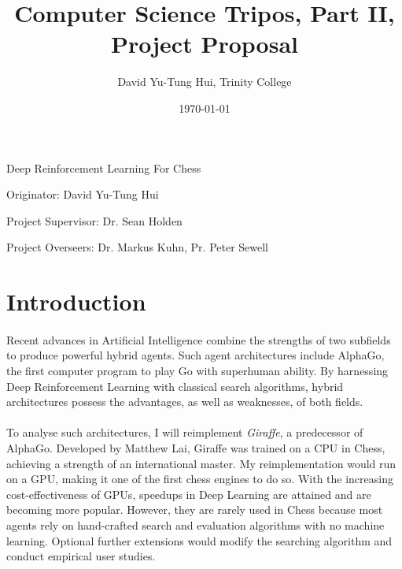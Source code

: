 \documentclass[a4paper]{article}
\title{Computer Science Tripos, Part II, Project Proposal}
\author{David Yu-Tung Hui, Trinity College}
\date{\today}
\begin{document}
\maketitle

\centerline{\huge Deep Reinforcement Learning For Chess}
\vspace{0.2in}
\centerline{\large Originator: David Yu-Tung Hui}
\vspace{0.05in}
\centerline{\large Project Supervisor: Dr. Sean Holden}
\vspace{0.05in}
\centerline{\large Project Overseers: Dr. Markus Kuhn, Pr. Peter Sewell}


\section*{Introduction}

\paragraph{}Recent advances in Artificial Intelligence combine the strengths of two subfields to produce powerful hybrid agents. Such agent architectures include AlphaGo, the first computer program to play Go with superhuman ability. \cite{AlphaGo} By harnessing Deep Reinforcement Learning with classical search algorithms, hybrid architectures possess the advantages, as well as weaknesses, of both fields.

\paragraph{}To analyse such architectures, I will reimplement \textit{Giraffe}, a predecessor of AlphaGo. Developed by Matthew Lai, Giraffe was trained on a CPU in Chess, achieving a strength of an international master. \cite{giraffe} My reimplementation would run on a GPU, making it one of the first chess engines to do so. With the increasing cost-effectiveness of GPUs, speedups in Deep Learning are attained and are becoming more popular. However, they are rarely used in Chess because most agents rely on hand-crafted search and evaluation algorithms with no machine learning. Optional further extensions would modify the searching algorithm and conduct empirical user studies.
\end{document}
